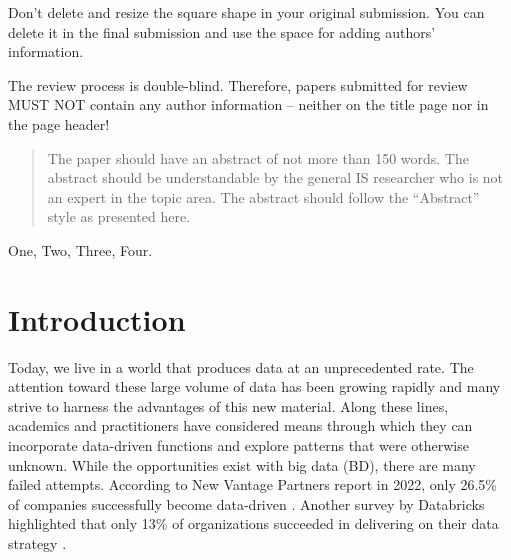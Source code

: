 \documentclass[a4paper,11pt,article,oneside]{memoir}
\begin{document}
\noindent\fbox{%
	\parbox{\textwidth}{%
		\hfill{}
		\vspace{10em}
	}%
}

Don’t delete and resize the square shape in your original submission. You can delete it in the final submission and use the space for adding authors’ information.

The review process is double-blind. Therefore, papers submitted for review MUST NOT contain any author information – neither on the title page nor in the page header!

\begin{abstract}\noindent
  The paper should have an abstract of not more than 150 words. The abstract should be understandable by the general IS researcher who is not an expert in the topic area. The abstract should follow the “Abstract” style as presented here.
\end{abstract}

\begin{keywords}
  One, Two, Three, Four.
\end{keywords}



\chapter{Introduction}


Today, we live in a world that produces data at an unprecedented rate. The attention toward these large volume of data has been growing rapidly and many strive to harness the advantages of this new material. Along these lines, academics and practitioners have considered means through which they can incorporate data-driven functions and explore patterns that were otherwise unknown. While the opportunities exist with big data (BD), there are many failed attempts. According to New Vantage Partners report in 2022, only 26.5\% of companies successfully become data-driven \cite{NewVantageSurvey}. Another survey by Databricks highlighted that only 13\% of organizations succeeded in delivering on their data strategy \cite{DataBricksSurvey}. 
\end{document}
